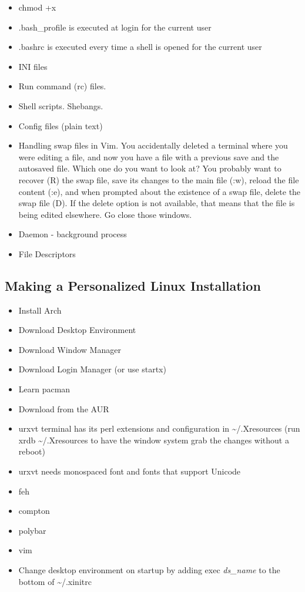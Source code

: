 \begin{itemize}
	\item chmod +x
	\item .bash\_profile is executed at login for the current user
	\item .bashrc is executed every time a shell is opened for the current user
	\item INI files
	\item Run command (rc) files.
	\item Shell scripts. Shebangs.
	\item Config files (plain text)
	\item Handling swap files in Vim. You accidentally deleted a terminal where you were editing a file, and now you have a file with a previous save and the autosaved file. Which one do you want to look at? You probably want to recover (R) the swap file, save its changes to the main file (:w), reload the file content (:e), and when prompted about the existence of a swap file, delete the swap file (D). If the delete option is not available, that means that the file is being edited elsewhere. Go close those windows.
	\item Daemon - background process
	\item File Descriptors
\end{itemize}

\subsection{Making a Personalized Linux Installation}

\begin{itemize}
	\item Install Arch
	\item Download Desktop Environment
	\item Download Window Manager
	\item Download Login Manager (or use startx)
	\item Learn pacman
	\item Download from the AUR
	\item urxvt terminal has its perl extensions and configuration in \textasciitilde/.Xresources (run xrdb \textasciitilde/.Xresources to have the window system grab the changes without a reboot)
	\item urxvt needs monospaced font and fonts that support Unicode
	\item feh
	\item compton
	\item polybar
	\item vim
	\item Change desktop environment on startup by adding exec \textit{ds\_name} to the bottom of \textasciitilde/.xinitrc
\end{itemize}

